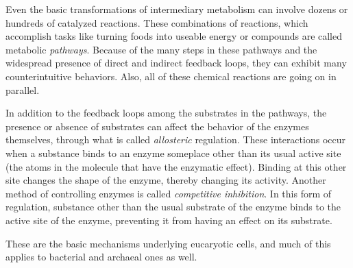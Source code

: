 Even the basic transformations of intermediary metabolism can involve dozens or
hundreds of catalyzed reactions. These combinations of reactions, which
accomplish tasks like turning foods into useable energy or compounds are called
metabolic \emph{pathways}. Because of the many steps in these pathways and the
widespread presence of direct and indirect feedback loops, they can exhibit many
counterintuitive behaviors. Also, all of these chemical reactions are going on
in parallel.

In addition to the feedback loops among the substrates in the pathways, the
presence or absence of substrates can affect the behavior of the enzymes
themselves, through what is called \emph{allosteric} regulation. These
interactions occur when a substance binds to an enzyme someplace other than its
usual active site (the atoms in the molecule that have the enzymatic effect).
Binding at this other site changes the shape of the enzyme, thereby changing its
activity. Another method of controlling enzymes is called \emph{competitive
inhibition}. In this form of regulation, substance other than the usual
substrate of the enzyme binds to the active site of the enzyme, preventing it
from having an effect on its substrate.

These are the basic mechanisms underlying eucaryotic cells, and much of this
applies to bacterial and archaeal ones as well.
